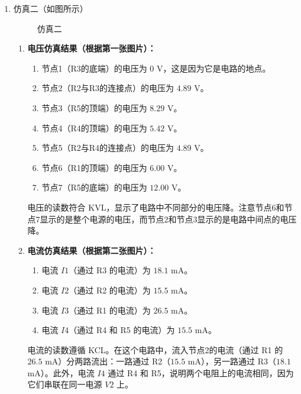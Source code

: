 \documentclass[dvipsnames, svgnames,a4paper,11pt]{article}
\begin{document}
\begin{enumerate}
\begin{enumerate}
\begin{enumerate}
			\end{enumerate}
			
			\item 仿真二（如图所示）
			
			\begin{figure}[htbp]
				\centering
				\caption{仿真二}
				\label{fig:fig2-2}			
			\end{figure}
			
			\begin{enumerate}
				\item \textbf{电压仿真结果（根据第一张图片）：}
				
				\begin{enumerate}
					\item 节点1（R3的底端）的电压为 $0$ V，这是因为它是电路的地点。
					\item 节点2（R2与R3的连接点）的电压为 $4.89$ V。
					\item 节点3（R5的顶端）的电压为 $8.29$ V。
					\item 节点4（R4的顶端）的电压为 $5.42$ V。
					\item 节点5（R2与R4的连接点）的电压为 $4.89$ V。
					\item 节点6（R1的顶端）的电压为 $6.00$ V。
					\item 节点7（R5的底端）的电压为 $12.00$ V。
				\end{enumerate}
				
				电压的读数符合 KVL，显示了电路中不同部分的电压降。注意节点6和节点7显示的是整个电源的电压，而节点2和节点3显示的是电路中间点的电压降。
				
				\item \textbf{电流仿真结果（根据第二张图片）：}
				
				\begin{enumerate}
					\item 电流 $I1$（通过 R3 的电流）为 $18.1$ mA。
					\item 电流 $I2$（通过 R2 的电流）为 $15.5$ mA。
					\item 电流 $I3$（通过 R1 的电流）为 $26.5$ mA。
					\item 电流 $I4$（通过 R4 和 R5 的电流）为 $15.5$ mA。
				\end{enumerate}
				
				电流的读数遵循 KCL。在这个电路中，流入节点2的电流（通过 R1 的 $26.5$ mA）分两路流出：一路通过 R2（$15.5$ mA），另一路通过 R3（$18.1$ mA）。此外，电流 $I4$ 通过 R4 和 R5，说明两个电阻上的电流相同，因为它们串联在同一电源 $V2$ 上。
				

\end{enumerate}
\end{enumerate}
\end{enumerate}
\end{document}
